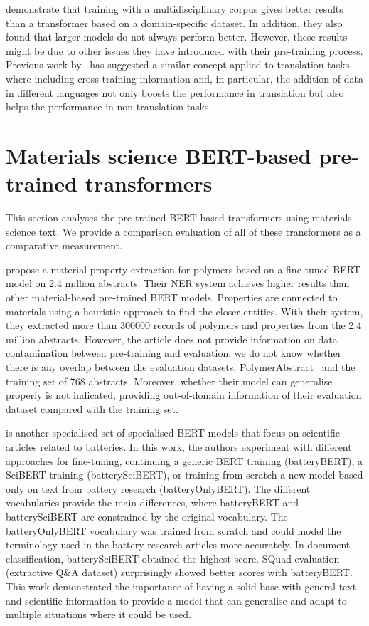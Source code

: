\cite{hong2022ScholarBERT} demonstrate that training with a multidisciplinary corpus gives better results than a transformer based on a domain-specific dataset. In addition, they also found that larger models do not always perform better. However, these results might be due to other issues they have introduced with their pre-training process. 
Previous work by~\cite{lample2019cross} has suggested a similar concept applied to translation tasks, where including cross-training information and, in particular, the addition of data in different languages not only boosts the performance in translation but also helps the performance in non-translation tasks. 


\section{Materials science BERT-based pre-trained transformers}

This section analyses the pre-trained BERT-based transformers using materials science text. We provide a comparison evaluation of all of these transformers as a comparative measurement. 

\cite{pranav2023a} propose a material-property extraction for polymers based on a fine-tuned BERT model on 2.4 million abstracts. Their NER system achieves higher results than other material-based pre-trained BERT models. Properties are connected to materials using a heuristic approach to find the closer entities.
With their system, they extracted more than 300000 records of polymers and properties from the 2.4 million abstracts. 
However, the article does not provide information on data contamination between pre-training and evaluation: we do not know whether there is any overlap between the evaluation datasets, PolymerAbstract~\cite{huan2016a} and the training set of 768 abstracts. 
Moreover, whether their model can generalise properly is not indicated, providing out-of-domain information of their evaluation dataset compared with the training set. 

\cite{huang2020batterybert} is another specialised set of specialised BERT models that focus on scientific articles related to batteries. In this work, the authors experiment with different approaches for fine-tuning, continuing a generic BERT training (batteryBERT), a SciBERT training (batterySciBERT), or training from scratch a new model based only on text from battery research (batteryOnlyBERT). The different vocabularies provide the main differences, where batteryBERT and batterySciBERT are constrained by the original vocabulary. The batteryOnlyBERT vocabulary was trained from scratch and could model the terminology used in the battery research articles more accurately. 
In document classification, batterySciBERT obtained the highest score. SQuad evaluation (extractive Q\&A dataset) surprisingly showed better scores with batteryBERT. This work demonstrated the importance of having a solid base with general text and scientific information to provide a model that can generalise and adapt to multiple situations where it could be used. 

